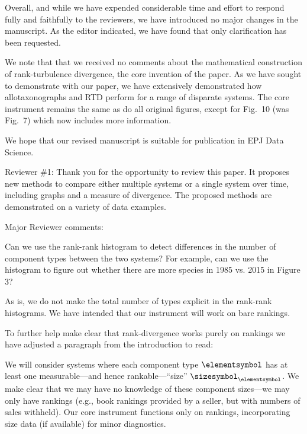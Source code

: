 Overall, and while we have expended considerable time and effort
to respond fully and faithfully to the reviewers,
we have introduced no major changes in the manuscript.
As the editor indicated, we have found that only clarification
has been requested.

We note that that we received no comments about the mathematical
construction of rank-turbulence divergence, the core invention of
the paper.
As we have sought to demonstrate with our paper,
we have extensively demonstrated how allotaxonographs and RTD perform
for a range of disparate systems.
The core instrument remains the same as do all original figures,
except for Fig.~10 (was Fig.~7) which now includes more information.

We hope that our revised manuscript is suitable for publication in
EPJ Data Science.


\begin{reviewercomment}
  Reviewer \#1: Thank you for the opportunity to
  review this paper. It proposes new methods to compare either
  multiple systems or a single system over time, including graphs and
  a measure of divergence. The proposed methods are demonstrated on a
  variety of data examples.

  Major Reviewer comments:

  Can we use the rank-rank histogram to detect differences in the number
  of component types between the two systems? For example, can we use
  the histogram to figure out whether there are more species in 1985
  vs. 2015 in Figure 3?
\end{reviewercomment}

As is, we do not make the total number of types explicit in the
rank-rank histograms. We have intended that our instrument will
work on bare rankings.

To further help make clear that rank-divergence works purely on rankings we have adjusted
a paragraph from the introduction to read:
\begin{excerpt}
  We will consider systems where
  each component type $\elementsymbol$ has at
  least one measurable---and hence rankable---``size'' $\sizesymbol_{\elementsymbol}$.
  We make clear that we may have no knowledge of these component sizes---we may only have rankings (e.g., book rankings provided by a seller,
  but with numbers of sales withheld).
  Our core instrument functions only on rankings,
  incorporating size data (if available) for minor diagnostics.
\end{excerpt}

